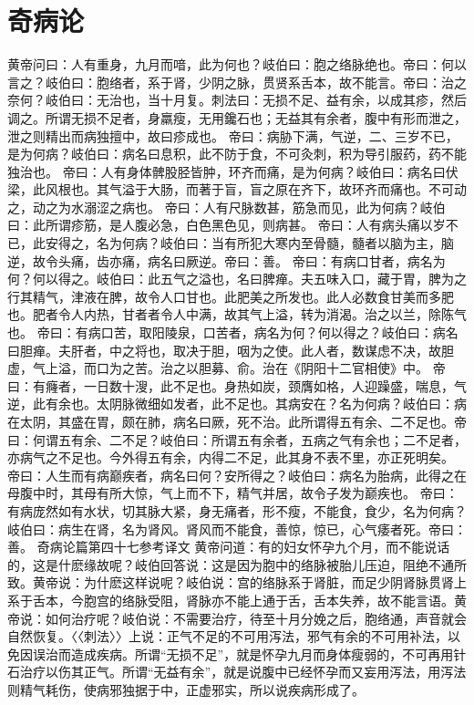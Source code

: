 \documentclass[a4paper,12pt,UTF8,twoside]{ctexbook}
\begin{document}
\chapter{奇病论}
黄帝问曰：人有重身，九月而喑，此为何也？岐伯曰：胞之络脉绝也。帝曰：何以言之？岐伯曰：胞络者，系于肾，少阴之脉，贯贤系舌本，故不能言。帝曰：治之奈何？岐伯曰：无治也，当十月复。刺法曰：无损不足、益有余，以成其疹，然后调之。所谓无损不足者，身羸瘦，无用鑱石也；无益其有余者，腹中有形而泄之，泄之则精出而病独擅中，故曰疹成也。
帝曰：病胁下满，气逆，二、三岁不已，是为何病？岐伯曰：病名曰息积，此不防于食，不可灸刺，积为导引服药，药不能独治也。
帝曰：人有身体髀股胫皆肿，环齐而痛，是为何病？岐伯曰：病名曰伏梁，此风根也。其气溢于大肠，而著于盲，盲之原在齐下，故环齐而痛也。不可动之，动之为水溺涩之病也。
帝曰：人有尺脉数甚，筋急而见，此为何病？岐伯曰：此所谓疹筋，是人腹必急，白色黑色见，则病甚。
帝曰：人有病头痛以岁不已，此安得之，名为何病？岐伯曰：当有所犯大寒内至骨髓，髓者以脑为主，脑逆，故令头痛，齿亦痛，病名曰厥逆。帝曰：善。
帝曰：有病口甘者，病名为何？何以得之。岐伯曰：此五气之溢也，名曰脾瘅。夫五味入口，藏于胃，脾为之行其精气，津液在脾，故令人口甘也。此肥美之所发也。此人必数食甘美而多肥也。肥者令人内热，甘者者令人中满，故其气上溢，转为消渴。治之以兰，除陈气也。
帝曰：有病口苦，取阳陵泉，口苦者，病名为何？何以得之？岐伯曰：病名曰胆瘅。夫肝者，中之将也，取决于胆，咽为之使。此人者，数谋虑不决，故胆虚，气上溢，而口为之苦。治之以胆募、俞。治在《阴阳十二官相使》中。
帝曰：有癃者，一日数十溲，此不足也。身热如炭，颈膺如格，人迎躁盛，喘息，气逆，此有余也。太阴脉微细如发者，此不足也。其病安在？名为何病？岐伯曰：病在太阴，其盛在胃，颇在肺，病名曰厥，死不治。此所谓得五有余、二不足也。帝曰：何谓五有余、二不足？岐伯曰：所谓五有余者，五病之气有余也；二不足者，亦病气之不足也。今外得五有余，内得二不足，此其身不表不里，亦正死明矣。
帝曰：人生而有病巅疾者，病名曰何？安所得之？岐伯曰：病名为胎病，此得之在母腹中时，其母有所大惊，气上而不下，精气并居，故令子发为巅疾也。
帝曰：有病庞然如有水状，切其脉大紧，身无痛者，形不瘦，不能食，食少，名为何病？岐伯曰：病生在肾，名为肾风。肾风而不能食，善惊，惊已，心气痿者死。帝曰：善。
奇病论篇第四十七参考译文
黄帝问道：有的妇女怀孕九个月，而不能说话的，这是什麽缘故呢？岐伯回答说：这是因为胞中的络脉被胎儿压迫，阻绝不通所致。黄帝说：为什麽这样说呢？岐伯说：宫的络脉系于肾脏，而足少阴肾脉贯肾上系于舌本，今胞宫的络脉受阻，肾脉亦不能上通于舌，舌本失养，故不能言语。黄帝说：如何治疗呢？岐伯说：不需要治疗，待至十月分娩之后，胞络通，声音就会自然恢复。〈〈刺法〉〉上说：正气不足的不可用泻法，邪气有余的不可用补法，以免因误治而造成疾病。所谓“无损不足”，就是怀孕九月而身体瘦弱的，不可再用针石治疗以伤其正气。所谓“无益有余”，就是说腹中已经怀孕而又妄用泻法，用泻法则精气耗伤，使病邪独据于中，正虚邪实，所以说疾病形成了。
\end{document}
